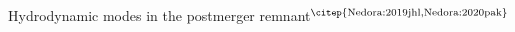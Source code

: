 \begin{frame}{Hydrodynamic modes in the postmerger remnant$^\text{\citep{Nedora:2019jhl,Nedora:2020pak}}$}





%
%

\end{frame}



%

